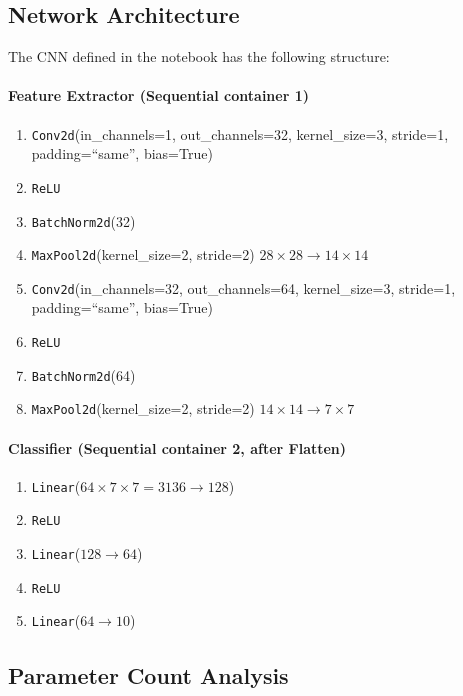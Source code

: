 \documentclass[12pt,a4paper]{article}
\begin{document}
\subsection{Network Architecture}
\label{subsec:architecture}

The CNN defined in the notebook has the following structure:

\paragraph{Feature Extractor (Sequential container 1)}
\begin{enumerate}[label=\textbf{\arabic*.}]
  \item \texttt{Conv2d}(in\_channels=1, out\_channels=32,
        kernel\_size=3, stride=1, padding=``same'', bias=True)
  \item \texttt{ReLU}
  \item \texttt{BatchNorm2d}(32)
  \item \texttt{MaxPool2d}(kernel\_size=2, stride=2)
        \hfill $28\times28 \to 14\times14$
  \item \texttt{Conv2d}(in\_channels=32, out\_channels=64,
        kernel\_size=3, stride=1, padding=``same'', bias=True)
  \item \texttt{ReLU}
  \item \texttt{BatchNorm2d}(64)
  \item \texttt{MaxPool2d}(kernel\_size=2, stride=2)
        \hfill $14\times14 \to 7\times7$
\end{enumerate}

\paragraph{Classifier (Sequential container 2, after Flatten)}
\begin{enumerate}[label=\textbf{\arabic*.}]
  \item \texttt{Linear}($64\times7\times7 = 3136 \to 128$)
  \item \texttt{ReLU}
  \item \texttt{Linear}($128 \to 64$)
  \item \texttt{ReLU}
  \item \texttt{Linear}($64 \to 10$)
\end{enumerate}

\subsection{Parameter Count Analysis}
\label{subsec:param_count}
\end{document}
